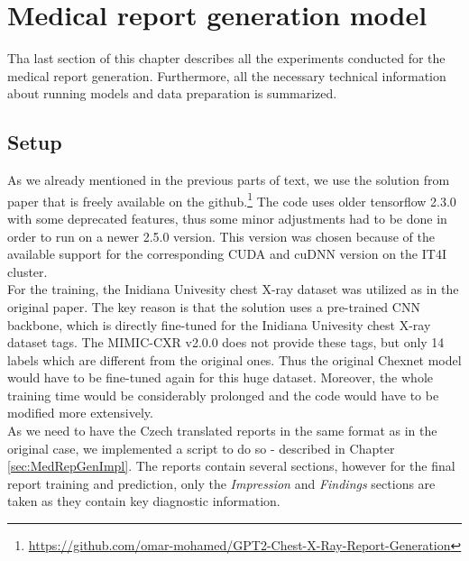 \section{Medical report generation model}
Tha last section of this chapter describes all the experiments conducted for the medical report generation. Furthermore, all the necessary technical information about running models and data preparation is summarized.

\subsection{Setup}
As we already mentioned in the previous parts of text, we use the solution from \citet{alfarghaly2021automated} paper that is freely available on the github.\footnote[4]{\url{https://github.com/omar-mohamed/GPT2-Chest-X-Ray-Report-Generation}} The code uses older tensorflow 2.3.0 with some deprecated features, thus some minor adjustments had to be done in order to run on a newer 2.5.0 version. This version was chosen because of the available support for the corresponding CUDA and cuDNN version on the IT4I cluster. \\

For the training, the Inidiana Univesity chest X-ray dataset was utilized as in the original paper. The key reason is that the solution uses a pre-trained CNN backbone, which is directly fine-tuned for the Inidiana Univesity chest X-ray dataset tags. The MIMIC-CXR v2.0.0 does not provide these tags, but only 14 labels which are different from the original ones. Thus the original Chexnet model would have to be fine-tuned again for this huge dataset. Moreover, the whole training time would be considerably prolonged and the code would have to be modified more extensively.\\
 
As we need to have the Czech translated reports in the same format as in the original case, we implemented a script to do so - described in Chapter \ref{sec:MedRepGenImpl}. The reports contain several sections, however for the final report training and prediction, only the \textit{Impression} and \textit{Findings} sections are taken as they contain key diagnostic information. 

